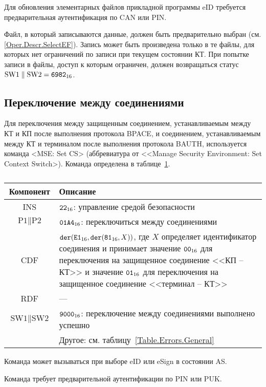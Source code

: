Для обновления элементарных файлов прикладной программы eID 
требуется предварительная аутентификация по CAN или PIN.

Файл, в который записываются данные, должен быть предварительно
выбран (см. \ref{Oper.Descr.SelectEF}).
Запись может быть произведена только в те файлы, для которых 
нет ограничений по записи при текущем состоянии КТ. 
При попытке записи в файлы, доступ к которым ограничен, 
должен возвращаться статус $\text{SW1} \parallel\text{SW2} = \texttt{6982}_{16}$. 

\subsection{Переключение между соединениями}
\label{Oper.Descr.SetCS}

Для переключения между защищенным соединением,
устанавливаемым между КТ и КП после выполнения 
протокола BPACE, и соединением, 
устанавливаемым между КТ и терминалом после выполнения 
протокола BAUTH, используется команда <MSE: Set CS> (аббревиатура от <<Manage 
Security Environment: Set Context Switch>).
Команда определена в таблице~\ref{Table.Oper.SetCSCmd}.

\begin{table}[hbt]
\caption{}\label{Table.Oper.SetCSCmd}
\begin{tabular}{|c|p{14cm}|}
\hline
Компонент & Описание \\
\hline
\hline
INS & $\texttt{22}_{16}$: управление средой безопасности\\ 
\hline
$\text{P1} \parallel\text{P2}$ & $\texttt{01A4}_{16}$: 
переключиться между соединениями \\
\hline
CDF & 
$\texttt{der}(\texttt{E1}_{16}, \texttt{der}(\texttt{81}_{16}, X))$, 
где $X$ определяет идентификатор
соединения и принимает значение $\texttt{00}_{16}$ для
переключения на защищенное соединение <<КП -- КТ>>
и значение $\texttt{01}_{16}$ для переключения на защищенное
соединение <<терминал -- КТ>>\\ 
\hline 
RDF &  --- \\
\hline
$\text{SW1} \parallel \text{SW2}$ & 
$\texttt{9000}_{16}$: переключение между соединениями выполнено успешно \\
\cline{2-2}
 & Другое: см. таблицу~\ref{Table.Errors.General} \\
\hline
\end{tabular}
\end{table}

Команда может вызываться при выборе eID или eSign в состоянии AS.

Команда требует предварительной аутентификации по PIN или PUK.

